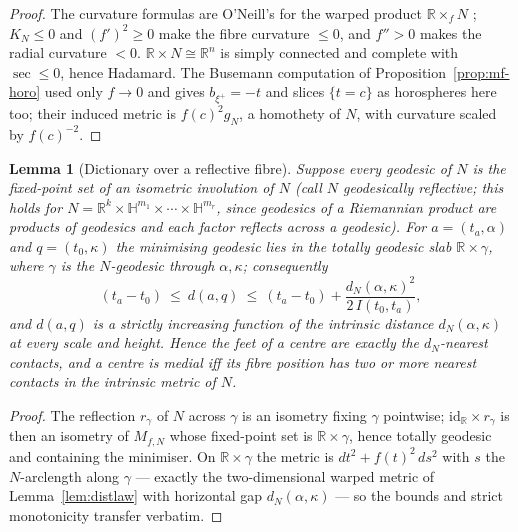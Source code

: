 \documentclass[11pt]{article}
\newtheorem{lemma}[theorem]{Lemma}
\theoremstyle{remark}
\newcommand{\R}{\mathbb{R}}
\newcommand{\HH}{\mathbb{H}}
\begin{document}
\begin{proof}
The curvature formulas are O'Neill's for the warped product
$\R\times_{f}N$ \cite[Prop.~7.42]{One}; $K_{N}\le0$ and $(f')^{2}\ge0$
make the fibre curvature $\le0$, and $f''>0$ makes the radial curvature
$<0$. $\R\times N\cong\R^{n}$ is simply connected and complete with
$\sec\le0$, hence Hadamard. The Busemann computation of
Proposition~\ref{prop:mf-horo} used only $f\to0$ and gives
$b_{\xi^{+}}=-t$ and slices $\{t=c\}$ as horospheres here too; their
induced metric is $f(c)^{2}g_{N}$, a homothety of $N$, with curvature
scaled by $f(c)^{-2}$.
\end{proof}

\begin{lemma}[Dictionary over a reflective fibre]\label{lem:fN-dict}
Suppose every geodesic of $N$ is the fixed-point set of an isometric
involution of $N$ (call $N$ \emph{geodesically reflective}; this holds
for $N=\R^{k}\times\HH^{m_{1}}\times\cdots\times\HH^{m_{r}}$, since
geodesics of a Riemannian product are products of geodesics and each
factor reflects across a geodesic). For $a=(t_{a},\alpha)$ and
$q=(t_{0},\kappa)$ the minimising geodesic lies in the totally geodesic
slab $\R\times\gamma$, where $\gamma$ is the $N$-geodesic through
$\alpha,\kappa$; consequently
\[
  (t_{a}-t_{0})\ \le\ d(a,q)\ \le\
  (t_{a}-t_{0})+\frac{d_{N}(\alpha,\kappa)^{2}}{2\,I(t_{0},t_{a})},
\]
and $d(a,q)$ is a strictly increasing function of the intrinsic
distance $d_{N}(\alpha,\kappa)$ at every scale and height. Hence the
feet of a centre are exactly the $d_{N}$-nearest contacts, and a centre
is medial iff its fibre position has two or more nearest contacts in
the intrinsic metric of $N$.
\end{lemma}

\begin{proof}
The reflection $r_{\gamma}$ of $N$ across $\gamma$ is an isometry
fixing $\gamma$ pointwise; $\mathrm{id}_{\R}\times r_{\gamma}$ is then
an isometry of $M_{f,N}$ whose fixed-point set is $\R\times\gamma$,
hence totally geodesic and containing the minimiser. On
$\R\times\gamma$ the metric is $dt^{2}+f(t)^{2}\,ds^{2}$ with $s$ the
$N$-arclength along $\gamma$ --- exactly the two-dimensional warped
metric of Lemma~\ref{lem:distlaw} with horizontal gap
$d_{N}(\alpha,\kappa)$ --- so the bounds and strict monotonicity
transfer verbatim.
\end{proof}
\end{document}
